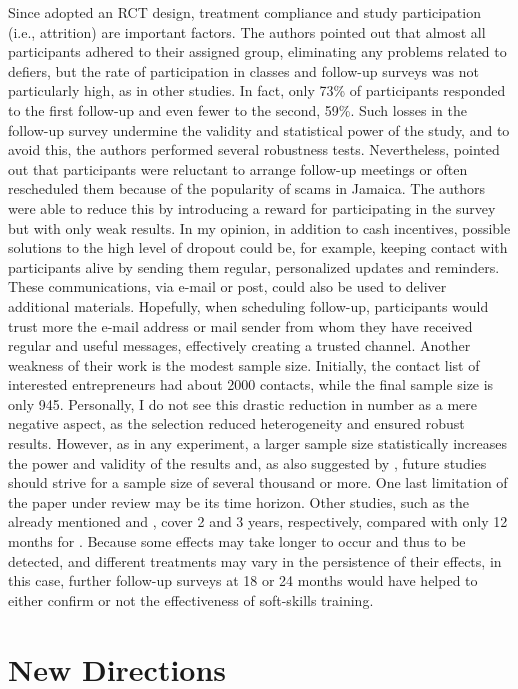 Since \cite{Ubfal2022} adopted an RCT design, treatment compliance and study participation (i.e., attrition) are important factors. The authors pointed out that almost all participants adhered to their assigned group, eliminating any problems related to defiers, but the rate of participation in classes and follow-up surveys was not particularly high, as in other studies. In fact, only 73\% of participants responded to the first follow-up and even fewer to the second, 59\%. Such losses in the follow-up survey undermine the validity and statistical power of the study, and to avoid this, the authors performed several robustness tests. Nevertheless, \cite{Ubfal2022} pointed out that participants were reluctant to arrange follow-up meetings or often rescheduled them because of the popularity of scams in Jamaica. The authors were able to reduce this by introducing a reward for participating in the survey but with only weak results. In my opinion, in addition to cash incentives, possible solutions to the high level of dropout could be, for example, keeping contact with participants alive by sending them regular, personalized updates and reminders. These communications, via e-mail or post, could also be used to deliver additional materials. Hopefully, when scheduling follow-up, participants would trust more the e-mail address or mail sender from whom they have received regular and useful messages, effectively creating a trusted channel. Another weakness of their work is the modest sample size. Initially, the contact list of interested entrepreneurs had about 2000 contacts, while the final sample size is only 945. Personally, I do not see this drastic reduction in number as a mere negative aspect, as the selection reduced heterogeneity and ensured robust results. However, as in any experiment, a larger sample size statistically increases the power and validity of the results and, as also suggested by \cite{McKenzie2014}, future studies should strive for a sample size of several thousand or more. One last limitation of the paper under review may be its time horizon. Other studies, such as the already mentioned \cite{Campos2017} and \cite{Bakhtiar2022}, cover 2 and 3 years, respectively, compared with only 12 months for \cite{Ubfal2022}. Because some effects may take longer to occur and thus to be detected, and different treatments may vary in the persistence of their effects, in this case, further follow-up surveys at 18 or 24 months would have helped to either confirm or not the effectiveness of soft-skills training.

\section{New Directions}

